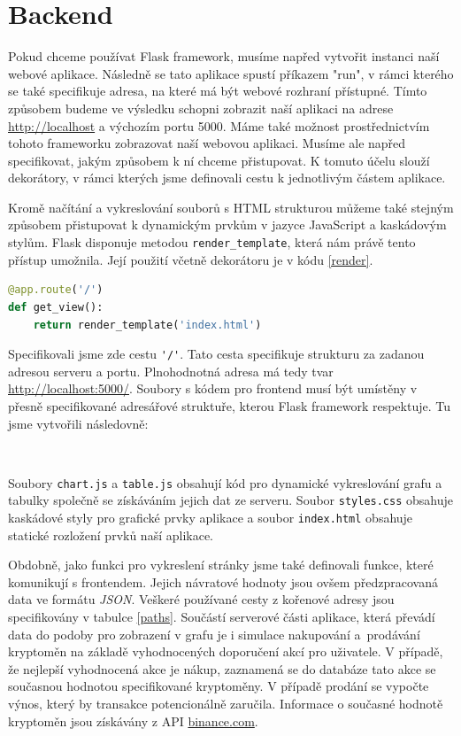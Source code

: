 \section{Backend}

Pokud chceme používat Flask framework, musíme napřed vytvořit instanci naší webové aplikace. 
Následně se tato aplikace spustí příkazem "run", v rámci kterého se také specifikuje adresa, na které má být webové rozhraní přístupné. 
Tímto způsobem budeme ve výsledku schopni zobrazit naší aplikaci na adrese \url{http://localhost} a výchozím portu 5000. 
Máme také možnost prostřednictvím tohoto frameworku zobrazovat naší webovou aplikaci.
Musíme ale napřed specifikovat, jakým způsobem k ní chceme přistupovat. 
K tomuto účelu slouží dekorátory, v rámci kterých jsme definovali cestu k jednotlivým částem aplikace. 

Kromě načítání a vykreslování souborů s HTML strukturou můžeme také stejným způsobem přistupovat k dynamickým prvkům v jazyce JavaScript a kaskádovým stylům.
Flask disponuje metodou \verb|render_template|, která nám právě tento přístup umožnila. 
Její použití včetně dekorátoru je v kódu \ref{render}.

\begin{lstlisting}[caption={~Vykreslování šablony},label=render,captionpos=t,float,abovecaptionskip=-\medskipamount,belowcaptionskip=\medskipamount,language=Python]
@app.route('/')
def get_view():
    return render_template('index.html')    
\end{lstlisting}

Specifikovali jsme zde cestu \verb|'/'|.
Tato cesta specifikuje strukturu za zadanou adresou serveru a portu.
Plnohodnotná adresa má tedy tvar \url{http://localhost:5000/}. 
Soubory s kódem pro frontend musí být umístěny v přesně specifikované adresářové struktuře, kterou Flask framework respektuje. 
Tu jsme vytvořili následovně:


\

Soubory \verb|chart.js| a \verb|table.js| obsahují kód pro dynamické vykreslování grafu a tabulky společně se získáváním jejich dat ze serveru.
Soubor \verb|styles.css| obsahuje kaskádové styly pro grafické prvky aplikace a soubor \verb|index.html| obsahuje statické rozložení prvků naší aplikace.

Obdobně, jako funkci pro vykreslení stránky jsme také definovali funkce, které komunikují s frontendem. 
Jejich návratové hodnoty jsou ovšem předzpracovaná data ve formátu \textit{JSON}. 
Veškeré používané cesty z kořenové adresy jsou specifikovány v tabulce \ref{paths}.
Součástí serverové části aplikace, která převádí data do podoby pro zobrazení v grafu je i simulace nakupování a~prodávání kryptoměn na základě vyhodnocených doporučení akcí pro uživatele. V případě, že nejlepší vyhodnocená akce je nákup, zaznamená se do databáze tato akce se současnou hodnotou specifikované kryptoměny. V případě prodání se vypočte výnos, který by transakce potencionálně zaručila. Informace o současné hodnotě kryptoměn jsou získávány z API \url{binance.com}.

